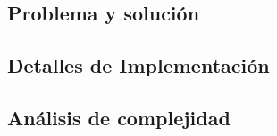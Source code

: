 \subsection*{Problema y solución}

\subsection*{Detalles de Implementación}

\subsection*{Análisis de complejidad}
